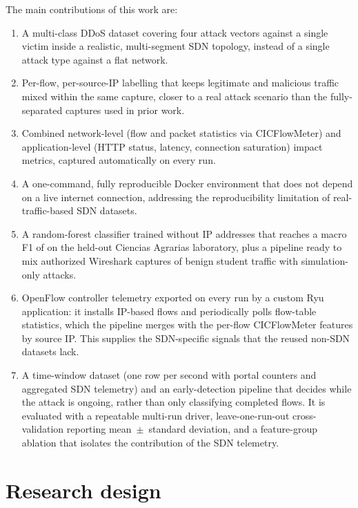 \documentclass[a4paper,fleqn]{cas-dc}
\begin{document}
The main contributions of this work are:
\begin{enumerate}[label=\roman*.]
  \item A multi-class DDoS dataset covering four attack vectors
        against a single victim inside a realistic, multi-segment SDN
        topology, instead of a single attack type against a flat
        network.
  \item Per-flow, per-source-IP labelling that keeps legitimate and
        malicious traffic mixed within the same capture, closer to a
        real attack scenario than the fully-separated captures used
        in prior work.
  \item Combined network-level (flow and packet statistics via
        CICFlowMeter) and application-level (HTTP status, latency,
        connection saturation) impact metrics, captured automatically
        on every run.
  \item A one-command, fully reproducible Docker environment that
        does not depend on a live internet connection, addressing the
        reproducibility limitation of real-traffic-based SDN
        datasets.
  \item A random-forest classifier trained without IP addresses that
        reaches a macro F1 of \Fmacro on the held-out Ciencias
        Agrarias laboratory, plus a pipeline ready to mix authorized
        Wireshark captures of benign student traffic with
        simulation-only attacks.
  \item OpenFlow controller telemetry exported on every run by a custom
        Ryu application: it installs IP-based flows and periodically
        polls flow-table statistics, which the pipeline merges with the
        per-flow CICFlowMeter features by source IP. This supplies the
        SDN-specific signals that the reused non-SDN datasets lack.
  \item A time-window dataset (one row per second with portal counters
        and aggregated SDN telemetry) and an early-detection pipeline
        that decides while the attack is ongoing, rather than only
        classifying completed flows. It is evaluated with a repeatable
        multi-run driver, leave-one-run-out cross-validation reporting
        mean~$\pm$~standard deviation, and a feature-group ablation that
        isolates the contribution of the SDN telemetry.
\end{enumerate}

\section{Research design}\label{sec:research}
\end{document}
